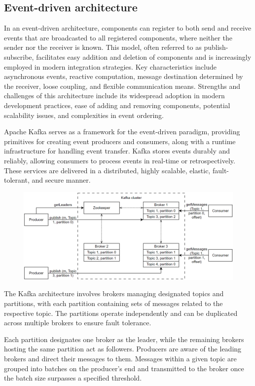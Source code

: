 \subsection*{Event-driven architecture}
In an event-driven architecture, components can register to both send and receive events that are broadcasted to all registered components, where neither the sender nor the receiver is known.
This model, often referred to as publish-subscribe, facilitates easy addition and deletion of components and is increasingly employed in modern integration strategies.
Key characteristics include asynchronous events, reactive computation, message destination determined by the receiver, loose coupling, and flexible communication means.
Strengths and challenges of this architecture include its widespread adoption in modern development practices, ease of adding and removing components, potential scalability issues, and complexities in event ordering.

Apache Kafka serves as a framework for the event-driven paradigm, providing primitives for creating event producers and consumers, along with a runtime infrastructure for handling event transfer. 
Kafka stores events durably and reliably, allowing consumers to process events in real-time or retrospectively. 
These services are delivered in a distributed, highly scalable, elastic, fault-tolerant, and secure manner.
\begin{figure}[H]
    \centering
    \includegraphics[width=0.75\linewidth]{images/kafka.png}
\end{figure}
The Kafka architecture involves brokers managing designated topics and partitions, with each partition containing sets of messages related to the respective topic. 
The partitions operate independently and can be duplicated across multiple brokers to ensure fault tolerance.

Each partition designates one broker as the leader, while the remaining brokers hosting the same partition act as followers. 
Producers are aware of the leading brokers and direct their messages to them. 
Messages within a given topic are grouped into batches on the producer's end and transmitted to the broker once the batch size surpasses a specified threshold.

